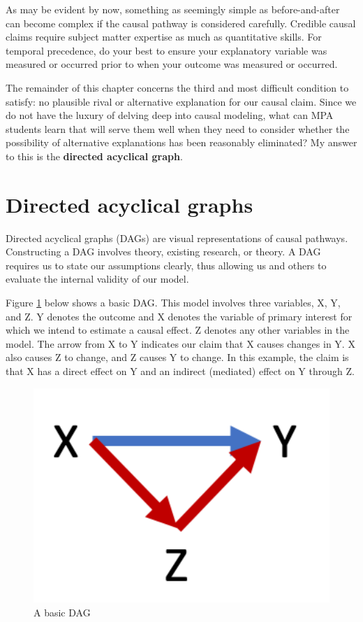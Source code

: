 \documentclass[
]{book}
\begin{document}
As may be evident by now, something as seemingly simple as before-and-after can become complex if the causal pathway is considered carefully. Credible causal claims require subject matter expertise as much as quantitative skills. For temporal precedence, do your best to ensure your explanatory variable was measured or occurred prior to when your outcome was measured or occurred.

The remainder of this chapter concerns the third and most difficult condition to satisfy: no plausible rival or alternative explanation for our causal claim. Since we do not have the luxury of delving deep into causal modeling, what can MPA students learn that will serve them well when they need to consider whether the possibility of alternative explanations has been reasonably eliminated? My answer to this is the \textbf{directed acyclical graph}.

\hypertarget{directed-acyclical-graphs}{%
\section{Directed acyclical graphs}\label{directed-acyclical-graphs}}

Directed acyclical graphs (DAGs) are visual representations of causal pathways. Constructing a DAG involves theory, existing research, or theory. A DAG requires us to state our assumptions clearly, thus allowing us and others to evaluate the internal validity of our model.

Figure \ref{fig:dagbasic} below shows a basic DAG. This model involves three variables, X, Y, and Z. Y denotes the outcome and X denotes the variable of primary interest for which we intend to estimate a causal effect. Z denotes any other variables in the model. The arrow from X to Y indicates our claim that X causes changes in Y. X also causes Z to change, and Z causes Y to change. In this example, the claim is that X has a direct effect on Y and an indirect (mediated) effect on Y through Z.

\begin{figure}
\includegraphics[width=4.42in]{images/dag_basic} \caption{A basic DAG}\label{fig:dagbasic}
\end{figure}
\end{document}
